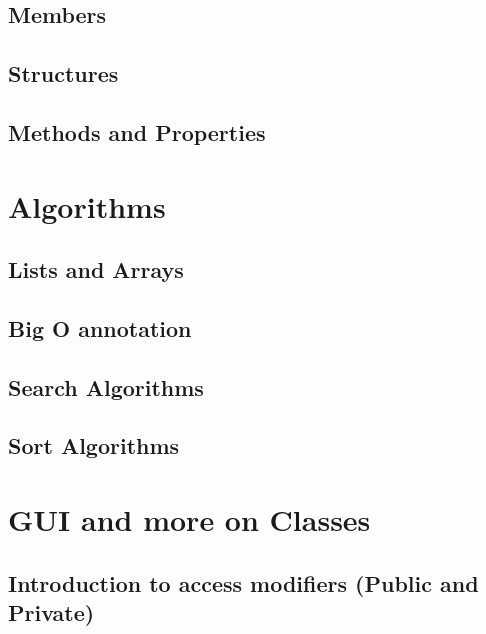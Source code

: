 \documentclass[
]{book}
\theoremstyle{definition}
\theoremstyle{definition}
\theoremstyle{definition}
\theoremstyle{remark}
\begin{document}
\hypertarget{members}{%
\section{Members}\label{members}}

\hypertarget{structures}{%
\section{Structures}\label{structures}}

\hypertarget{methods-and-properties}{%
\section{Methods and Properties}\label{methods-and-properties}}

\hypertarget{algorithms}{%
\chapter{Algorithms}\label{algorithms}}

\hypertarget{lists-and-arrays}{%
\section{Lists and Arrays}\label{lists-and-arrays}}

\hypertarget{big-o-annotation}{%
\section{Big O annotation}\label{big-o-annotation}}

\hypertarget{search-algorithms}{%
\section{Search Algorithms}\label{search-algorithms}}

\hypertarget{sort-algorithms}{%
\section{Sort Algorithms}\label{sort-algorithms}}

\hypertarget{gui-and-more-on-classes}{%
\chapter{GUI and more on Classes}\label{gui-and-more-on-classes}}

\hypertarget{introduction-to-access-modifiers-public-and-private}{%
\section{Introduction to access modifiers (Public and Private)}\label{introduction-to-access-modifiers-public-and-private}}
\end{document}
